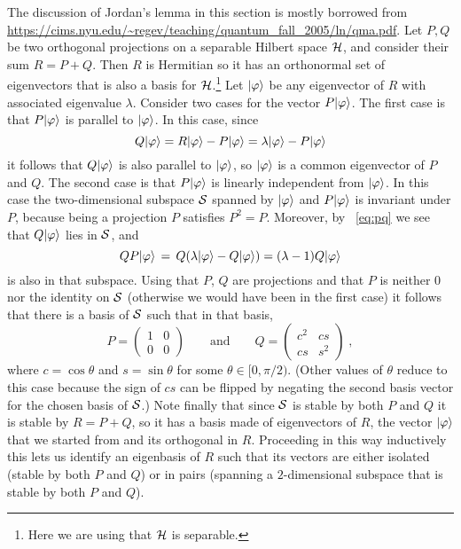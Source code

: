 The discussion of Jordan's lemma in this section is mostly borrowed from \url{https://cims.nyu.edu/~regev/teaching/quantum_fall_2005/ln/qma.pdf}. Let $P,Q$ be two orthogonal projections on a separable Hilbert space $\mathcal{H}$, and consider their sum $R=P+Q$. Then $R$ is Hermitian so it has an orthonormal set of eigenvectors that is also a basis for $\mathcal{H}$.\footnote{Here we are using that $\mathcal{H}$ is separable.} Let $|\varphi\rangle$ be  any eigenvector of $R$ with associated eigenvalue $\lambda$. Consider two cases for the vector $P|\varphi\rangle$. The first case is that $P|\varphi\rangle$ is parallel to $|\varphi\rangle$. In this case, since
\begin{equation}\label{eq:pq}
Q|\varphi\rangle = R|\varphi\rangle - P|\varphi\rangle = \lambda |\varphi\rangle - P |\varphi\rangle
\end{equation}
it follows that $Q|\varphi\rangle$ is also parallel to $|\varphi\rangle$, so $|\varphi\rangle$ is a common eigenvector of $P$ and $Q$. The second case is that $P|\varphi\rangle$ is linearly independent from $|\varphi\rangle$. In this case the two-dimensional subspace $\mathcal{S}$ spanned by $|\varphi\rangle$ and $P|\varphi\rangle$ is invariant under $P$, because being a projection $P$ satisfies $P^2=P$. Moreover, by
~\eqref{eq:pq} we see that $Q|\varphi\rangle$ lies in $\mathcal{S}$, and  
\[ Q P |\varphi\rangle \,=\, Q (\lambda |\varphi\rangle  - Q |\varphi\rangle) = (\lambda-1)Q |\varphi\rangle\]
is also in that subspace. Using that $P$, $Q$ are projections and that $P$ is neither $0$ nor the identity on $\mathcal{S}$ (otherwise we would have been in the first case) it follows that there is a basis of $\mathcal{S}$ such that in that basis, 
\begin{equation}\label{eq:pq-form}
 P = \begin{pmatrix} 1 & 0 \\ 0 & 0 \end{pmatrix} \qquad \text{and} \qquad Q = \begin{pmatrix} c^2 & cs \\ cs & s^2 \end{pmatrix}\;,
\end{equation}
where $c = \cos\theta$ and $s=\sin\theta$ for some $\theta \in [0,\pi/2)$. (Other values of $\theta$ reduce to this case because the sign of $cs$ can be flipped by negating the second basis vector for the chosen basis of $\mathcal{S}$.) Note finally that since $\mathcal{S}$ is stable by both $P$ and $Q$ it is stable by $R=P+Q$, so it has a basis made of eigenvectors of $R$, the vector $|\varphi\rangle$ that we started from and its orthogonal in $R$. Proceeding in this way inductively this lets us identify an eigenbasis of $R$ such that its vectors are either isolated (stable by both $P$ and $Q$) or in pairs (spanning a $2$-dimensional subspace that is stable by both $P$ and $Q$). 

